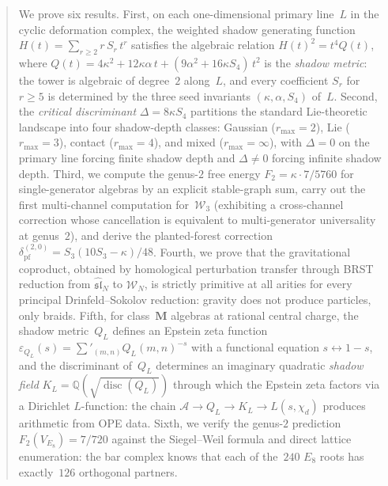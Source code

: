 \documentclass[11pt,reqno]{amsart}
\theoremstyle{definition}
\theoremstyle{remark}
\newcommand{\cA}{\mathcal{A}}
\newcommand{\cW}{\mathcal{W}}
\numberwithin{equation}{section}
\begin{document}
\begin{abstract}
We prove six results.
First, on each one-dimensional primary line~$L$ in the
cyclic deformation complex, the weighted shadow generating function
$H(t) = \sum_{r \ge 2} r\, S_r\, t^r$ satisfies the algebraic
relation $H(t)^2 = t^4 Q(t)$, where
$Q(t) = 4\kappa^2 + 12\kappa\alpha\, t
+ (9\alpha^2 + 16\kappa S_4)\, t^2$
is the \emph{shadow metric}: the tower is algebraic of degree~$2$
along~$L$, and every coefficient $S_r$ for $r \ge 5$ is determined
by the three seed invariants $(\kappa, \alpha, S_4)$ of~$L$.
Second, the \emph{critical discriminant} $\Delta = 8\kappa S_4$
partitions the standard Lie-theoretic landscape into four shadow-depth
classes: Gaussian ($r_{\max} = 2$), Lie ($r_{\max} = 3$), contact
($r_{\max} = 4$), and mixed ($r_{\max} = \infty$), with $\Delta = 0$
on the primary line forcing finite shadow depth and $\Delta \ne 0$
forcing infinite shadow depth.
Third, we compute the genus-$2$ free energy
$F_2 = \kappa \cdot 7/5760$ for single-generator algebras
by an explicit stable-graph sum, carry out the first
multi-channel computation for~$\mathcal{W}_3$ (exhibiting
a cross-channel correction whose cancellation is equivalent
to multi-generator universality at genus~$2$), and derive
the planted-forest correction
$\delta_{\mathrm{pf}}^{(2,0)} = S_3(10 S_3 - \kappa)/48$.
Fourth, we prove that the gravitational coproduct, obtained by
homological perturbation transfer through BRST reduction from
$\widehat{\mathfrak{sl}}_N$ to $\cW_N$, is strictly primitive
at all arities for every principal Drinfeld--Sokolov reduction:
gravity does not produce particles, only braids.
Fifth, for class~$\mathbf{M}$ algebras at rational central
charge, the shadow metric~$Q_L$ defines an Epstein zeta function
$\varepsilon_{Q_L}(s) = \sum'_{(m,n)} Q_L(m,n)^{-s}$
with a functional equation $s \leftrightarrow 1-s$, and the
discriminant of~$Q_L$ determines an imaginary quadratic
\emph{shadow field}
$K_L = \mathbb{Q}(\sqrt{\operatorname{disc}(Q_L)})$
through which the Epstein zeta factors via a
Dirichlet $L$-function: the chain
$\cA \to Q_L \to K_L \to L(s, \chi_d)$ produces
arithmetic from OPE data.
Sixth, we verify the genus-$2$ prediction $F_2(V_{E_8}) = 7/720$
against the Siegel--Weil formula and direct lattice enumeration:
the bar complex knows that each of the~$240$ $E_8$ roots has
exactly~$126$ orthogonal partners.
\end{abstract}


\end{document}
